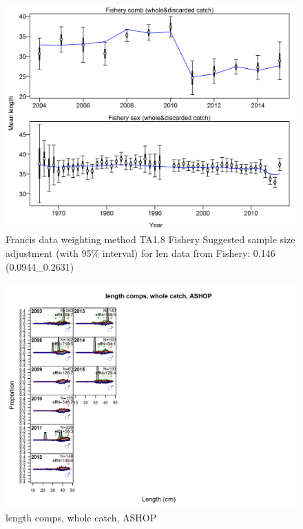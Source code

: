 \documentclass[12pt,]{article}
\begin{document}
\begin{figure}
\centering
\includegraphics{./r4ss/plots_mod1/comp_lenfit_data_weighting_TA1.8_Fishery.png}
\caption{Francis data weighting method TA1.8 Fishery Suggested sample
size adjustment (with 95\% interval) for len data from Fishery: 0.146
(0.0944\_0.2631)
\label{fig:mod1_9_comp_lenfit_data_weighting_TA1.8_Fishery}}
\end{figure}

\begin{figure}
\centering
\includegraphics{./r4ss/plots_mod1/comp_lenfit_flt2mkt0.png}
\caption{length comps, whole catch, ASHOP
\label{fig:mod1_10_comp_lenfit_flt2mkt0}}
\end{figure}
\end{document}
